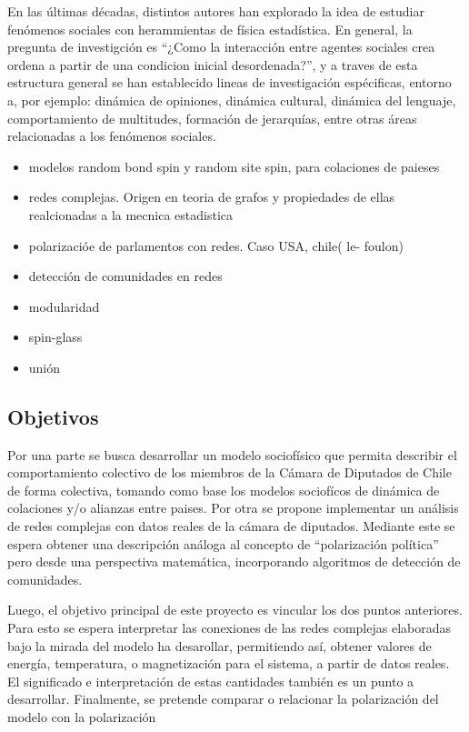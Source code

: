 \documentclass{proyectotesis}
\begin{document}
En las últimas décadas, distintos autores han explorado la idea de estudiar fenómenos sociales con herammientas de física estadística. En general, la pregunta de investigción es ``¿Como la interacción entre agentes sociales crea ordena a partir de una condicion inicial desordenada?'', y a traves de esta estructura general se han establecido lineas de investigación espécificas, entorno a, por ejemplo: dinámica de opiniones, dinámica cultural, dinámica del lenguaje, comportamiento de multitudes, formación de jerarquías, entre otras áreas relacionadas a los fenómenos sociales. 

\begin{itemize}
    \item modelos random bond spin y random site spin, para colaciones de paieses
    \item redes complejas. Origen en teoria de grafos y propiedades de ellas realcionadas a la mecnica estadistica
    \item polarizacióe de parlamentos con redes. Caso USA, chile( le- foulon)
    \item detección de comunidades en redes
    \item modularidad
    \item spin-glass
    \item unión
\end{itemize}

\subsection{Objetivos}

Por una parte se busca desarrollar un modelo sociofísico que permita describir el comportamiento colectivo de los miembros de la Cámara de Diputados de Chile de forma colectiva, tomando como base los modelos sociofícos de dinámica de colaciones y/o alianzas entre paises.  
Por otra se propone implementar un análisis de redes complejas con datos reales de la cámara de diputados. Mediante este se espera obtener una descripción análoga al concepto de ``polarización política'' pero desde una perspectiva matemática, incorporando algoritmos de detección de comunidades. 

Luego, el objetivo principal de este proyecto es vincular los dos puntos anteriores. Para esto se espera interpretar las conexiones de las redes complejas elaboradas bajo la mirada del modelo ha desarollar, permitiendo así, obtener valores de energía, temperatura, o magnetización para el sistema, a partir de datos reales. El significado e interpretación de estas cantidades también es un punto a desarrollar.
Finalmente, se pretende comparar o relacionar la polarización del modelo con la polarización
\end{document}
